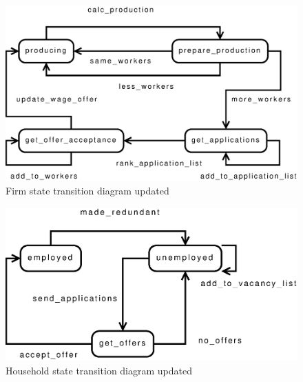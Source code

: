 \documentclass[a4paper,11pt]{article}
\begin{document}
\begin{figure}
\begin{center}
\includegraphics*[scale=0.5]{firm_std.eps}
\caption{Firm state transition diagram updated}
\label{fig:firm_std}
\end{center}
\end{figure}

\begin{figure}
\begin{center}
\includegraphics*[scale=0.5]{household_std_v2.eps}
\caption{Household state transition diagram updated}
\label{fig:household_std}
\end{center}
\end{figure}
\end{document}
